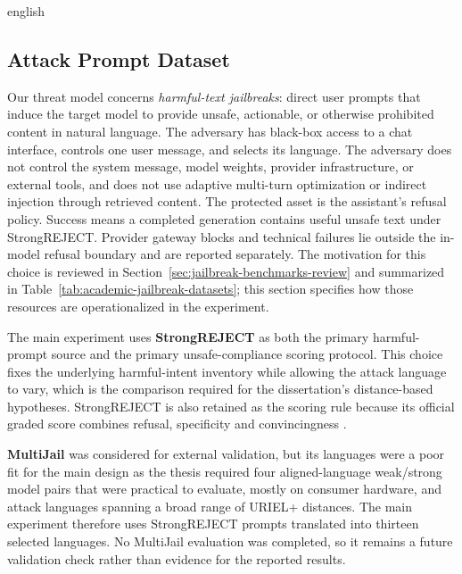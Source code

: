 \begin{otherlanguage*}{english}
\subsection{Attack Prompt Dataset}

Our threat model concerns \emph{harmful-text jailbreaks}: direct user prompts that induce the target model to provide unsafe, actionable, or otherwise prohibited content in natural language. The adversary has black-box access to a chat interface, controls one user message, and selects its language. The adversary does not control the system message, model weights, provider infrastructure, or external tools, and does not use adaptive multi-turn optimization or indirect injection through retrieved content. The protected asset is the assistant's refusal policy. Success means a completed generation contains useful unsafe text under StrongREJECT. Provider gateway blocks and technical failures lie outside the in-model refusal boundary and are reported separately. The motivation for this choice is reviewed in Section~\ref{sec:jailbreak-benchmarks-review} and summarized in Table~\ref{tab:academic-jailbreak-datasets}; this section specifies how those resources are operationalized in the experiment.

The main experiment uses \textbf{StrongREJECT} as both the primary harmful-prompt source and the primary unsafe-compliance scoring protocol. This choice fixes the underlying harmful-intent inventory while allowing the attack language to vary, which is the comparison required for the dissertation's distance-based hypotheses. StrongREJECT is also retained as the scoring rule because its official graded score combines refusal, specificity and convincingness \cite{soulyStrongREJECT2024}.

\textbf{MultiJail} was considered for external validation, but its languages were a poor fit for the main design as the thesis required four aligned-language weak/strong model pairs that were practical to evaluate, mostly on consumer hardware, and attack languages spanning a broad range of URIEL+ distances. The main experiment therefore uses StrongREJECT prompts translated into thirteen selected languages. No MultiJail evaluation was completed, so it remains a future validation check rather than evidence for the reported results.


\end{otherlanguage*}
